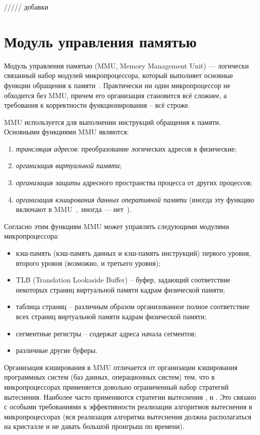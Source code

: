 ///// добавки

\section{Модуль управления памятью}

Модуль управления памятью (MMU, Memory Management Unit) ---
логически связанный набор модулей микропроцессора, который выполняет
основные функции обращения к памяти~\cite{MMU}. Практически ни один
микропроцессор не обходится без MMU, причем его организация
становится всё сложнее, а требования к корректности функционирования
-- всё строже.

MMU используется для выполнении инструкций обращения к памяти.
Основными функциями MMU являются:
\begin{enumerate}
  \item \emph{трансляция адресов}: преобразование логических адресов
  в физические;
  \item \emph{организация виртуальной памяти};
  \item \emph{организация защиты} адресного пространства процесса от
  других процессов;
  \item \emph{организация кэширования данных оперативной памяти}
  (иногда эту функцию включают в MMU~\cite{vorobyev},~иногда ---
  нет~\cite{thompson}).
\end{enumerate}

Согласно этим функциям MMU может управлять следующими модулями
микропроцессора:
\begin{itemize}
  \item кэш-память (кэш-память данных и кэш-память инструкций)
  первого уровня, второго уровня (возможно, и третьего уровня);
  \item TLB (Translation Lookaside Buffer) -- буфер, задающий
  соответствие некоторых страниц виртуальной памяти кадрам
  физической памяти;
  \item таблица страниц -- различным образом организованное полное
  соответствие всех страниц виртуальной памяти кадрам физической
  памяти;
  \item сегментные регистры -- содержат адреса начала сегментов;
  \item различные другие буферы.
\end{itemize}

Организация кэширования в MMU отличается от организации кэширования
программных систем (баз данных, операционных систем) тем, что в микропроцессорах
применяется довольно ограниченный набор стратегий вытеснения. Наиболее часто применяются
стратегии вытеснения \LRU, \FIFO и \PseudoLRU. Это связано с особыми требованиями
к эффективности реализации алгоритмов вытеснения в микропроцессорах (вся реализация
алгоритма вытеснения должна располагаться на кристалле и не давать большой проигрыш по времени).

